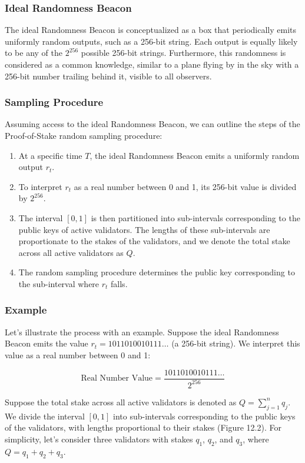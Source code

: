 \subsubsection{Ideal Randomness Beacon}
The ideal Randomness Beacon is conceptualized as a box that periodically emits uniformly random outputs, such as a 256-bit string. Each output is equally likely to be any of the $2^{256}$ possible 256-bit strings. Furthermore, this randomness is considered as a common knowledge, similar to a plane flying by in the sky with a 256-bit number trailing behind it, visible to all observers.

\subsubsection{Sampling Procedure}
Assuming access to the ideal Randomness Beacon, we can outline the steps of the Proof-of-Stake random sampling procedure:

\begin{enumerate}[label=(\alph*)]
  \item At a specific time $T$, the ideal Randomness Beacon emits a uniformly random output $r_t$.
  \item To interpret $r_t$ as a real number between 0 and 1, its 256-bit value is divided by $2^{256}$.
  \item The interval $[0, 1]$ is then partitioned into sub-intervals corresponding to the public keys of active validators. The lengths of these sub-intervals are proportionate to the stakes of the validators, and we denote the total stake across all active validators as $Q$.
  \item The random sampling procedure determines the public key corresponding to the sub-interval where $r_t$ falls.
\end{enumerate}

\subsubsection{Example}
Let's illustrate the process with an example. Suppose the ideal Randomness Beacon emits the value $r_t = 1011010010111\dots$ (a 256-bit string). We interpret this value as a real number between 0 and 1:

$$
\text{Real Number Value} = \frac{1011010010111\dots}{2^{256}}
$$

Suppose the total stake across all active validators is denoted as $Q = \sum_{j=1}^n q_j$. We divide the interval $[0, 1]$ into sub-intervals corresponding to the public keys of the validators, with lengths proportional to their stakes (Figure 12.2). For simplicity, let's consider three validators with stakes $q_1$, $q_2$, and $q_3$, where $Q = q_1 + q_2 + q_3$.

